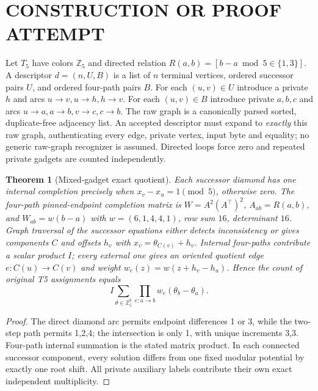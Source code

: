 \documentclass[11pt]{article}
\newtheorem{theorem}{Theorem}
\begin{document}
\section{CONSTRUCTION OR PROOF ATTEMPT}
Let $T_5$ have colors $\mathbb Z_5$ and directed relation $R(a,b)=[b-a\bmod5\in\{1,3\}]$. A descriptor $d=(n,U,B)$ is a list of $n$ terminal vertices, ordered successor pairs $U$, and ordered four-path pairs $B$. For each $(u,v)\in U$ introduce a private $h$ and arcs $u\to v,u\to h,h\to v$. For each $(u,v)\in B$ introduce private $a,b,c$ and arcs $u\to a,a\to b,v\to c,c\to b$. The raw graph is a canonically parsed sorted, duplicate-free adjacency list. An accepted descriptor must expand to \emph{exactly} this raw graph, authenticating every edge, private vertex, input byte and equality; no generic raw-graph recognizer is assumed. Directed loops force zero and repeated private gadgets are counted independently.

\begin{theorem}[Mixed-gadget exact quotient]
Each successor diamond has one internal completion precisely when $x_v-x_u=1\pmod5$, otherwise zero. The four-path pinned-endpoint completion matrix is $W=A^2(A^\top)^2$, $A_{ab}=R(a,b)$, and $W_{ab}=w(b-a)$ with $w=(6,1,4,4,1)$, row sum $16$, determinant $16$. Graph traversal of the successor equations either detects inconsistency or gives components $C$ and offsets $h_v$ with $x_v=\theta_{C(v)}+h_v$. Internal four-paths contribute a scalar product $I$; every external one gives an oriented quotient edge $e:C(u)\to C(v)$ and weight $w_e(z)=w(z+h_v-h_u)$. Hence the count of \emph{original} T5 assignments equals
\[
I\sum_{\theta\in\mathbb Z_5^q}\prod_{e:a\to b}w_e(\theta_b-\theta_a).
\]
\end{theorem}
\begin{proof}
The direct diamond arc permits endpoint differences 1 or 3, while the two-step path permits 1,2,4; the intersection is only 1, with unique increments 3,3. Four-path internal summation is the stated matrix product. In each connected successor component, every solution differs from one fixed modular potential by exactly one root shift. All private auxiliary labels contribute their own exact independent multiplicity.
\end{proof}
\end{document}
